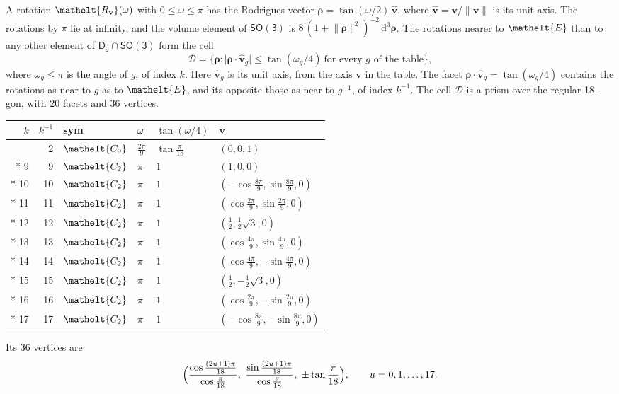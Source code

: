 \documentclass[10pt,a4paper]{article}
\numberwithin{equation}{section}
\newcommand{\eltfont}[1]{{\let\sigma\eltsigma\mathelt{#1}}}
\newcommand{\grp}[1]{\mathsf{#1}}
\newcommand{\cls}[1]{\eltfont{#1}}
\newcommand{\elt}[1]{\eltfont{#1}}
\newcommand{\dirvec}[3]{(#1, #2, #3)}
\newcommand{\unitaxis}{\hat{\mathbf{v}}}
\newcommand{\vv}{\mathbf{v}}
\newcommand{\diff}{\mathrm{d}}
\newcommand{\rodrigues}{\boldsymbol{\rho}}
\newcommand{\fcell}{\mathcal{D}}
\begin{document}
\leavevmode\label{n:vector.rodrigues}\label{n:vector.unitaxis}A rotation $\elt{R_{\vv}}(\omega)$ with $0 \le \omega \le \pi$ has the Rodrigues vector $\rodrigues = \tan(\omega/2)\,\unitaxis$, where $\unitaxis = \vv/\lVert\vv\rVert$ is its unit axis. The rotations by $\pi$ lie at infinity, and the volume element of \href{SO3.pdf}{$\grp{SO(3)}$} is $8\,(1 + \lVert\rodrigues\rVert^2)^{-2}\,\diff^3\rodrigues$.
\leavevmode\label{n:set.cell}The rotations nearer to $\elt{E}$ than to any other element of $\grp{D_{9}} \cap \grp{SO(3)}$ form the cell
\begin{equation}\label{e:cell}\fcell = \bigl\{\rodrigues : \lvert\rodrigues\cdot\unitaxis_g\rvert \le \tan(\omega_g/4)\ \text{for every $g$ of the table}\bigr\},\end{equation}
where $\omega_g \le \pi$ is the angle of $g$, of index $k$. Here $\unitaxis_g$ is its unit axis, from the axis $\vv$ in the table. The facet $\rodrigues\cdot\unitaxis_g = \tan(\omega_g/4)$ contains the rotations as near to $g$ as to $\elt{E}$, and its opposite those as near to $g^{-1}$, of index $k^{-1}$. The cell $\fcell$ is a prism over the regular 18-gon, with 20 facets and 36 vertices.
{\small{\renewcommand{\arraystretch}{1.3}\begin{longtable}{@{}rrllll@{}}\toprule
$k$ & $k^{-1}$ & sym & $\omega$ & $\tan(\omega/4)$ & $\vv$\\\midrule\endhead
\bottomrule\endfoot\endlastfoot
1 & 2 & $\cls{C_{9}}$ & $\tfrac{2\pi}{9}$ & $\tan\tfrac{\pi}{18}$ & $\dirvec{0}{0}{1}$\\*
9 & 9 & $\cls{C_{2}}$ & $\pi$ & $1$ & $\dirvec{1}{0}{0}$\\*
10 & 10 & $\cls{C_{2}}$ & $\pi$ & $1$ & $\dirvec{-\cos\tfrac{8\pi}{9}}{\sin\tfrac{8\pi}{9}}{0}$\\*
11 & 11 & $\cls{C_{2}}$ & $\pi$ & $1$ & $\dirvec{\cos\tfrac{2\pi}{9}}{\sin\tfrac{2\pi}{9}}{0}$\\*
12 & 12 & $\cls{C_{2}}$ & $\pi$ & $1$ & $\dirvec{\tfrac{1}{2}}{\tfrac{1}{2}\sqrt{3}}{0}$\\*
13 & 13 & $\cls{C_{2}}$ & $\pi$ & $1$ & $\dirvec{\cos\tfrac{4\pi}{9}}{\sin\tfrac{4\pi}{9}}{0}$\\*
14 & 14 & $\cls{C_{2}}$ & $\pi$ & $1$ & $\dirvec{\cos\tfrac{4\pi}{9}}{-\sin\tfrac{4\pi}{9}}{0}$\\*
15 & 15 & $\cls{C_{2}}$ & $\pi$ & $1$ & $\dirvec{\tfrac{1}{2}}{-\tfrac{1}{2}\sqrt{3}}{0}$\\*
16 & 16 & $\cls{C_{2}}$ & $\pi$ & $1$ & $\dirvec{\cos\tfrac{2\pi}{9}}{-\sin\tfrac{2\pi}{9}}{0}$\\*
17 & 17 & $\cls{C_{2}}$ & $\pi$ & $1$ & $\dirvec{-\cos\tfrac{8\pi}{9}}{-\sin\tfrac{8\pi}{9}}{0}$\\
\bottomrule\end{longtable}}}
\leavevmode\label{n:local.vertex.u}Its 36 vertices are
\begin{equation}\label{e:prism}\Bigl(\frac{\cos\frac{(2u+1)\pi}{18}}{\cos\frac{\pi}{18}},\ \frac{\sin\frac{(2u+1)\pi}{18}}{\cos\frac{\pi}{18}},\ \pm\tan\frac{\pi}{18}\Bigr),\qquad u = 0, 1, \dots, 17.\end{equation}
\end{document}
